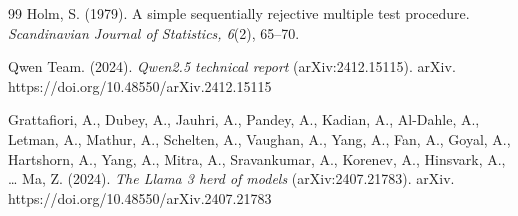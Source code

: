 \begin{thebibliography}{99}
 Holm, S. (1979). A simple sequentially rejective multiple test procedure. \emph{Scandinavian Journal of Statistics, 6}(2), 65--70.

 Qwen Team. (2024). \emph{Qwen2.5 technical report} (arXiv:2412.15115). arXiv. https://doi.org/10.48550/arXiv.2412.15115

 Grattafiori, A., Dubey, A., Jauhri, A., Pandey, A., Kadian, A., Al-Dahle, A., Letman, A., Mathur, A., Schelten, A., Vaughan, A., Yang, A., Fan, A., Goyal, A., Hartshorn, A., Yang, A., Mitra, A., Sravankumar, A., Korenev, A., Hinsvark, A., \ldots{} Ma, Z. (2024). \emph{The Llama 3 herd of models} (arXiv:2407.21783). arXiv. https://doi.org/10.48550/arXiv.2407.21783

\end{thebibliography}
